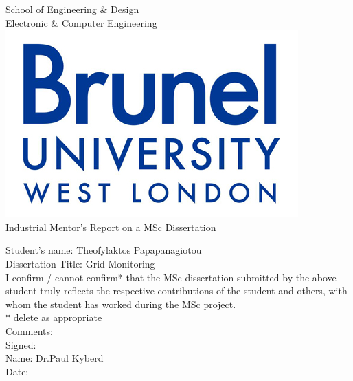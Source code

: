 \newpage
\thispagestyle{empty}
\begin{center}
\Large
School of Engineering \& Design\\
Electronic \& Computer Engineering\\
\vspace{0.5\baselineskip}
\includegraphics{images/brunellogo}\\
\Large
Industrial Mentor's Report on a MSc Dissertation\\
\end{center}
\Large
\vspace{0.5\baselineskip}
Student's name: Theofylaktos Papapanagiotou\\
Dissertation Title: Grid Monitoring\\

\vspace{0.5\baselineskip}
\large
\noindent
I confirm / cannot confirm* that the MSc dissertation submitted by the above student
truly reflects the respective contributions of the student and others, with whom the
student has worked during the MSc project.\\
\vspace{0.5\baselineskip}
$*$ delete as appropriate\\
\vspace{1\baselineskip}
Comments:\\

\vspace{2.5\baselineskip}
\noindent
Signed:\\
Name: Dr.Paul Kyberd\\
Date: